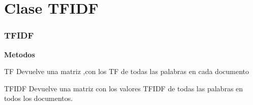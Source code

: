 
\section{Clase TFIDF}
\begin{frame}
    \frametitle{TFIDF}
\textbf{Metodos}
\begin{block}{TF}
    Devuelve una matriz ,con los TF de todas las palabras en cada
  documento
\end{block}
\pause
\begin{block}{TFIDF}
    Devuelve una matriz con los valores TFIDF de todas las
  palabras en todos los documentos.
\end{block}
\end{frame}